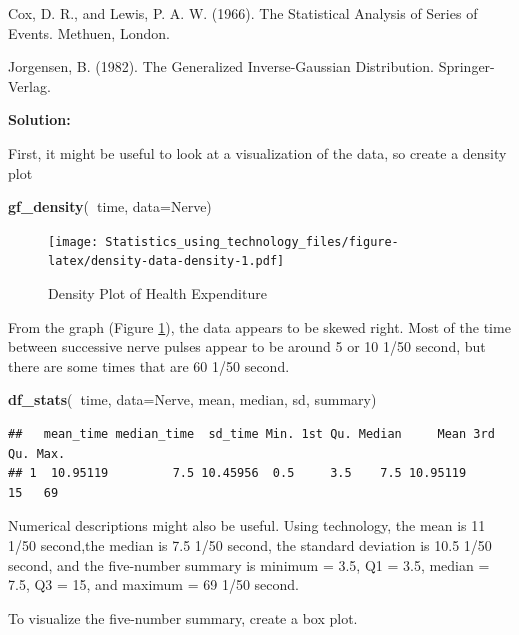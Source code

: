 \documentclass[
]{book}
\newenvironment{Shaded}{\begin{snugshade}}{\end{snugshade}}
\newcommand{\DataTypeTok}[1]{\textcolor[rgb]{0.13,0.29,0.53}{#1}}
\newcommand{\KeywordTok}[1]{\textcolor[rgb]{0.13,0.29,0.53}{\textbf{#1}}}
\newcommand{\NormalTok}[1]{#1}
\newcommand{\OperatorTok}[1]{\textcolor[rgb]{0.81,0.36,0.00}{\textbf{#1}}}
\begin{document}
Cox, D. R., and Lewis, P. A. W. (1966). The Statistical Analysis of Series of Events. Methuen, London.

Jorgensen, B. (1982). The Generalized Inverse-Gaussian Distribution. Springer-Verlag.

\textbf{Solution:}

First, it might be useful to look at a visualization of the data, so create a density plot



\begin{Shaded}
\begin{Highlighting}[]
\KeywordTok{gf_density}\NormalTok{(}\OperatorTok{~}\NormalTok{time, }\DataTypeTok{data=}\NormalTok{Nerve)}
\end{Highlighting}
\end{Shaded}

\begin{figure}
\centering
\texttt{[image: Statistics\_using\_technology\_files/figure-latex/density-data-density-1.pdf]}
\caption{\label{fig:density-data-density}Density Plot of Health Expenditure}
\end{figure}

From the graph (Figure \ref{fig:density-data-density}), the data appears to be skewed right. Most of the time between successive nerve pulses appear to be around 5 or 10 1/50 second, but there are some times that are 60 1/50 second.

\begin{Shaded}
\begin{Highlighting}[]
\KeywordTok{df_stats}\NormalTok{(}\OperatorTok{~}\NormalTok{time, }\DataTypeTok{data=}\NormalTok{Nerve, mean, median, sd, summary)}
\end{Highlighting}
\end{Shaded}

\begin{verbatim}
##   mean_time median_time  sd_time Min. 1st Qu. Median     Mean 3rd Qu. Max.
## 1  10.95119         7.5 10.45956  0.5     3.5    7.5 10.95119      15   69
\end{verbatim}

Numerical descriptions might also be useful. Using technology, the mean is 11 1/50 second,the median is 7.5 1/50 second, the standard deviation is 10.5 1/50 second, and the five-number summary is minimum = 3.5, Q1 = 3.5, median = 7.5, Q3 = 15, and maximum = 69 1/50 second.

To visualize the five-number summary, create a box plot.
\end{document}
